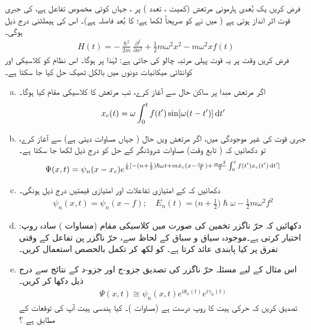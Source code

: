 فرض کریں یک بُعدی ہارمونی مرتعش (کمیت ، تعدد ) پر ، جہاں  کوئی مخصوص تفاعل ہے، کی جبری قوت اثر انداز ہوتی ہے ( میں نے  کو صریحاً لکھا ہے؛  کا بُعد فاصلہ ہے)۔ اس کی ہیملٹنی درج ذیل ہوگی۔
\begin{align}
H(t) = - \frac{\hslash^2}{2m} \frac{\partial^2}{\partial x^2} + \frac{1}{2} m \omega^2 x^2 - m \omega^2 x f (t)
\end{align}
فرض کریں وقت  پر یہ قوت پہلی مرتبہ چالو کی جاتی ہے: لہٰذا  پر  ہوگا۔ اس نظام کو کلاسیکی اور کوانٹائی میکانیات دونوں میں بالکل ٹھیک حل کیا جا سکتا ہے۔ 
\begin{enumerate}[a.]
\item
اگر مرتعش مبدا پر ساکن حال  سے آغاز کرے، تب مرتعش کا کلاسیکی مقام کیا ہوگا۔  
\begin{align}\label{مساوات_حر_کلاسیکی_مقام}
x_c (t) = \omega \int_0^{t} f(t') \sin [\omega (t - t')] \dif t'
\end{align}
\item
جبری قوت کی غیر موجودگی میں، اگر مرتعش  ویں حال (  جہاں  مساوات  دیتی ہے) سے آغاز کرے، تو دکھائیں کہ ( تابع وقت) مساوات شروڈنگر کے حل کو درج ذیل لکھا جا سکتا ہے۔ 
\begin{align}
\Psi (x, t) = \psi_n (x - x_c) e^{\frac{i}{\hslash} [- (n + \frac{1}{2}) \hslash \omega t + m \dot{x}_c (x - \frac{x_c}{2}) + \frac{m \omega^2}{2} \int_0^t f (t') x_c (t') \dif t']}
\end{align}
\item
دکھائیں کہ  کے امتیازی تفاعلات اور امتیازی قیمتیں درج ذیل ہونگی۔ 
\begin{align}
\psi_n (x, t) = \psi_n (x - f); \quad E_n (t) = \big ( n + \frac{1}{2} \big ) \hslash \omega - \frac{1}{2} m \omega^2 f^2
\end{align}
\item
دکھائیں کہ حرّ ناگزر تخمین کی صورت میں کلاسیکی مقام (مساوات ) سادہ روپ:  اختیار کرتی ہے۔موجودہ سیاق و سباق کے لحاظ سے، حرّ ناگزر پن تفاعل  کے وقتی تفرق پر کیا پابندی عائد کرتا ہے۔   کو  لکھ کر تکمل بالحصص استعمال کریں۔
\item
اس مثال کے لیے مسئلہ حرّ ناگزر کی تصدیق جزو-ج اور جزو-د کے نتائج سے درج ذیل دکھا کر کریں۔
\begin{align}
\Psi (x, t) \cong \psi_n (x, t) e^{i \theta_n (t)} e^{i \gamma_n (t)}
\end{align}
تصدیق کریں کہ حرکی ہیت کا روپ درست ہے (مساوات )۔ کیا ہندسی ہیت آپ کی توقعات کے مطابق ہے ؟
\end{enumerate}
